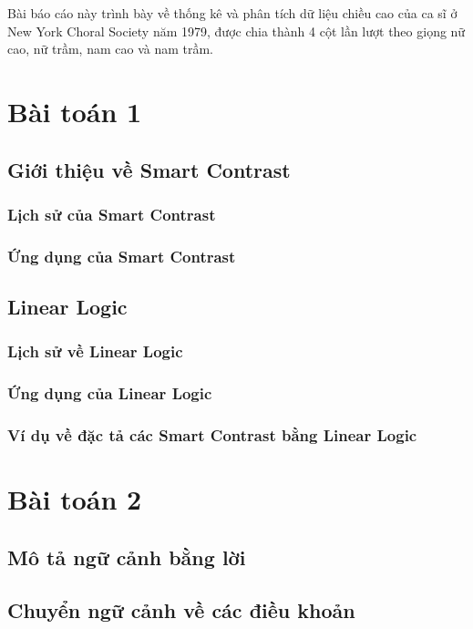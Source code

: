 \documentclass[a4paper]{article}
\begin{document}

\newpage
\tableofcontents
\newpage

Bài báo cáo này trình bày về thống kê và phân tích dữ liệu chiều cao của ca sĩ ở New York Choral Society năm 1979, được chia thành 4 cột lần lượt theo giọng nữ cao, nữ trầm, nam cao và nam trầm.

\section{Bài toán 1}
\subsection{Giới thiệu về Smart Contrast}
\subsubsection{Lịch sử của Smart Contrast}
\subsubsection{Ứng dụng của Smart Contrast}
\subsection{Linear Logic}
\subsubsection{Lịch sử về Linear Logic}
\subsubsection{Ứng dụng của Linear Logic}
\subsubsection{Ví dụ về đặc tả các Smart Contrast bằng Linear Logic}


\section{Bài toán 2}
\subsection{Mô tả ngữ cảnh bằng lời}

\subsection{Chuyển ngữ cảnh về các điều khoản}
\end{document}
